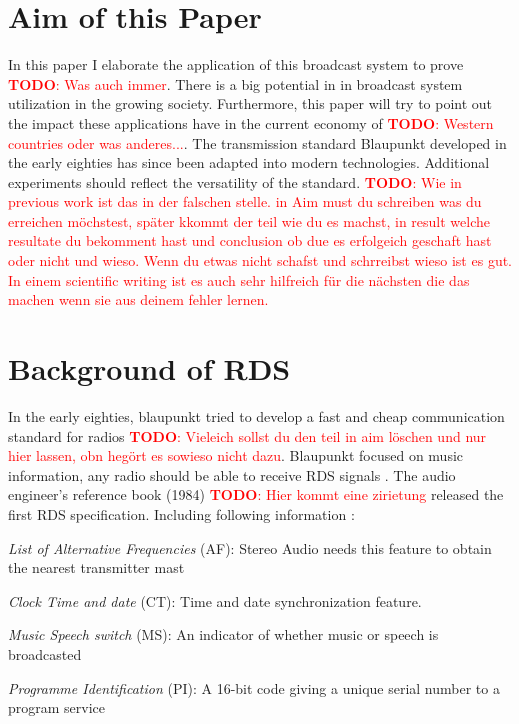 \documentclass[conference,11pt,a4paper]{IEEEtran}
\newcommand{\todo}[1]{\textcolor{red}{\textbf{TODO}: #1}}
\begin{document}
	\section{Aim of this Paper}
		In this paper I elaborate the application of this broadcast system to prove \todo{Was auch immer}. There is a big potential in in broadcast system utilization in the growing society. Furthermore, this paper will try to point out the impact these applications have in the current economy of \todo{Western countries oder was anderes...}. The transmission standard Blaupunkt developed in the early eighties has since been adapted into modern technologies. Additional experiments should reflect the versatility of the standard. \todo{Wie in previous work ist das in der falschen stelle. in Aim must du schreiben was du erreichen möchstest, später kkommt der teil wie du es machst, in result welche resultate du bekomment hast und conclusion ob due es erfolgeich geschaft hast oder nicht und wieso. Wenn du etwas nicht schafst und schrreibst wieso ist es gut. In einem scientific writing ist es auch sehr hilfreich für die nächsten die das machen wenn sie aus deinem fehler lernen.}\\		


		
	
	\section{Background of RDS}
		In the early eighties, blaupunkt tried to develop a fast and cheap communication standard for radios \todo{Vieleich sollst du den teil in aim löschen und nur hier lassen, obn hegört es sowieso nicht dazu}. Blaupunkt focused on music information, any radio should be able to receive RDS signals \cite{DietmanRDSbeginning}. The audio engineer’s reference book (1984) \todo{Hier kommt eine zirietung} released the first RDS specification. Including following information  \cite{firstRDSspecEBUTECH}:
		
		\textit{List of Alternative Frequencies} (AF): Stereo Audio needs this feature to obtain the nearest transmitter mast
		
		\textit{Clock Time and date} (CT): Time and date synchronization feature.
		
		\textit{Music Speech switch} (MS): An indicator of whether music or speech is broadcasted
		
		\textit{Programme Identification} (PI): A 16-bit code giving a unique serial number to a program service
		
\end{document}
